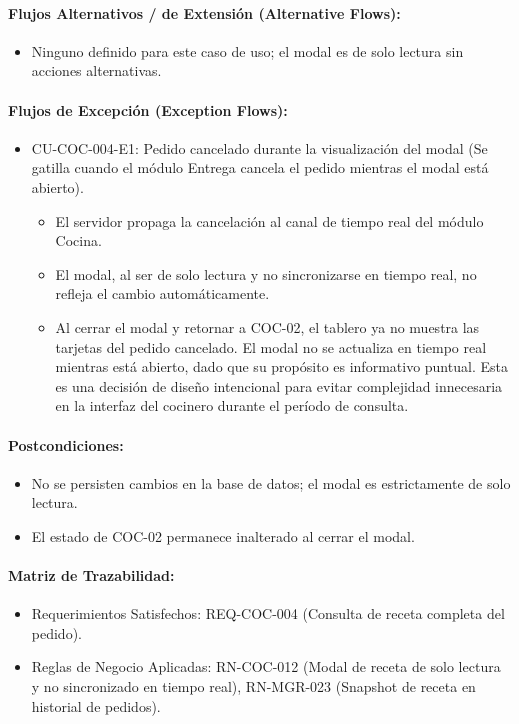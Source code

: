 \paragraph{Flujos Alternativos / de Extensión (Alternative Flows):}
\begin{itemize}
    \item Ninguno definido para este caso de uso; el modal es de solo lectura sin acciones alternativas.
\end{itemize}

\paragraph{Flujos de Excepción (Exception Flows):}
\begin{itemize}
    \item CU-COC-004-E1: Pedido cancelado durante la visualización del modal (Se gatilla cuando el módulo Entrega cancela el pedido mientras el modal está abierto).
    \begin{itemize}
        \item El servidor propaga la cancelación al canal de tiempo real del módulo Cocina.
        \item El modal, al ser de solo lectura y no sincronizarse en tiempo real, no refleja el cambio automáticamente.
        \item Al cerrar el modal y retornar a COC-02, el tablero ya no muestra las tarjetas del pedido cancelado. El modal no se actualiza en tiempo real mientras está abierto, dado que su propósito es informativo puntual. Esta es una decisión de diseño intencional para evitar complejidad innecesaria en la interfaz del cocinero durante el período de consulta.
    \end{itemize}
\end{itemize}

\paragraph{Postcondiciones:}
\begin{itemize}
    \item No se persisten cambios en la base de datos; el modal es estrictamente de solo lectura.
    \item El estado de COC-02 permanece inalterado al cerrar el modal.
\end{itemize}

\paragraph{Matriz de Trazabilidad:}
\begin{itemize}
    \item Requerimientos Satisfechos: REQ-COC-004 (Consulta de receta completa del pedido).
    \item Reglas de Negocio Aplicadas: RN-COC-012 (Modal de receta de solo lectura y no sincronizado en tiempo real), RN-MGR-023 (Snapshot de receta en historial de pedidos).
\end{itemize}

